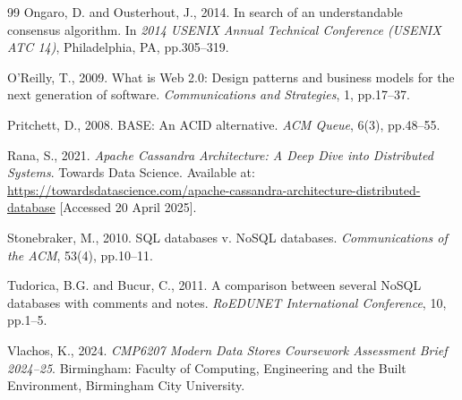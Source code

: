 \documentclass[11pt,a4paper]{article}
\begin{document}
\begin{thebibliography}{99}
Ongaro, D. and Ousterhout, J., 2014. In search of an understandable consensus algorithm. In \textit{2014 USENIX Annual Technical Conference (USENIX ATC 14)}, Philadelphia, PA, pp.305--319.

O'Reilly, T., 2009. What is Web 2.0: Design patterns and business models for the next generation of software. \textit{Communications and Strategies}, 1, pp.17--37.

Pritchett, D., 2008. BASE: An ACID alternative. \textit{ACM Queue}, 6(3), pp.48--55.

Rana, S., 2021. \textit{Apache Cassandra Architecture: A Deep Dive into Distributed Systems}. Towards Data Science. Available at: \url{https://towardsdatascience.com/apache-cassandra-architecture-distributed-database} [Accessed 20 April 2025].

Stonebraker, M., 2010. SQL databases v. NoSQL databases. \textit{Communications of the ACM}, 53(4), pp.10--11.

Tudorica, B.G. and Bucur, C., 2011. A comparison between several NoSQL databases with comments and notes. \textit{RoEDUNET International Conference}, 10, pp.1--5.

Vlachos, K., 2024. \textit{CMP6207 Modern Data Stores Coursework Assessment Brief 2024--25}. Birmingham: Faculty of Computing, Engineering and the Built Environment, Birmingham City University.

\end{thebibliography}
\end{document}
